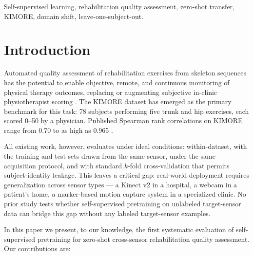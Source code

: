\documentclass[10pt,journal]{IEEEtran}
\begin{document}
\begin{IEEEkeywords}
Self-supervised learning, rehabilitation quality assessment, zero-shot transfer, KIMORE, domain shift, leave-one-subject-out.
\end{IEEEkeywords}

\section{Introduction}
\label{sec:intro}

Automated quality assessment of rehabilitation exercises from skeleton sequences has the potential to enable objective, remote, and continuous monitoring of physical therapy outcomes, replacing or augmenting subjective in-clinic physiotherapist scoring \cite{capecci2019kimore}. The KIMORE dataset \cite{capecci2019kimore} has emerged as the primary benchmark for this task: 78 subjects performing five trunk and hip exercises, each scored 0--50 by a physician. Published Spearman rank correlations on KIMORE range from 0.70 to as high as 0.965 \cite{karlov2024,abedi2023,kuang2026}.

All existing work, however, evaluates under ideal conditions: within-dataset, with the training and test sets drawn from the same sensor, under the same acquisition protocol, and with standard $k$-fold cross-validation that permits subject-identity leakage. This leaves a critical gap: real-world deployment requires generalization across sensor types --- a Kinect v2 in a hospital, a webcam in a patient's home, a marker-based motion capture system in a specialized clinic. No prior study tests whether self-supervised pretraining on unlabeled target-sensor data can bridge this gap without any labeled target-sensor examples.

In this paper we present, to our knowledge, the first systematic evaluation of self-supervised pretraining for zero-shot cross-sensor rehabilitation quality assessment. Our contributions are:
\end{document}
